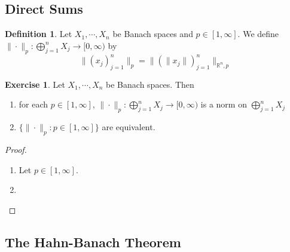 \documentclass[12pt]{amsart}
\theoremstyle{definition}
\newtheorem{defn}[definition]{Definition}
\newtheorem{ex}[definition]{Exercise}
\newcommand{\R}{\mathbb{R}}
\newcommand{\Rg}{[0,\infty)}
\begin{document}
	
	
	\subsection{Direct Sums}
	
	\begin{defn}
	Let $X_1, \cdots, X_n$ be Banach spaces and $p \in [1, \infty]$. We define $\| \cdot \|_p : \bigoplus\limits_{j=1}^n X_j \rightarrow \Rg$ by $$\|(x_j)_{j=1}^n\|_p = \|(\|x_j\|)_{j=1}^n \|_{\R^n, p}$$
	\end{defn}
	
	\begin{ex}	
	Let $X_1, \cdots, X_n$ be Banach spaces. Then 
	\begin{enumerate}
	\item for each $p \in [1, \infty]$, $\|\cdot\|_p:\bigoplus\limits_{j=1}^n X_j \rightarrow \Rg$ is a norm on $\bigoplus\limits_{j=1}^n X_j$
	\item  $\{\|\cdot \|_p:  p \in [1, \infty]\}$ are equivalent. 
	\end{enumerate}
	\end{ex}
	
	\begin{proof}\
	\begin{enumerate}
	\item Let $p \in [1, \infty]$.
	\item 
	\end{enumerate}
\end{proof}		


	
	
	










	\newpage
	
	
	
	
	
	
	
	
	
	
	
	
	
	
	
	

	

	
	\subsection{The Hahn-Banach Theorem}
	
\end{document}
